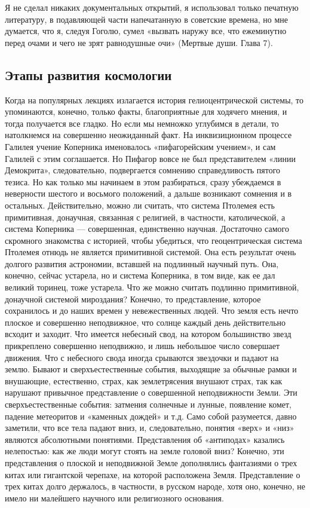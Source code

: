 Я не сделал никаких документальных открытий, я использовал только
печатную литературу, в подавляющей части напечатанную в советские
времена, но мне думается, что я, следуя Гоголю, сумел «вызвать наружу
все, что ежеминутно перед очами и чего не зрят равнодушные очи»
(Мертвые души. Глава 7).

\subsection{Этапы развития космологии}

Когда на популярных лекциях излагается история гелиоцентрической
системы, то упоминаются, конечно, только факты, благоприятные для
ходячего мнения, и тогда получается все гладко. Но если мы немножко
углубимся в детали, то натолкнемся на совершенно неожиданный факт. На
инквизиционном процессе Галилея учение Коперника именовалось
«пифагорейским учением», и сам Галилей с этим соглашается. Но Пифагор
вовсе не был представителем «линии Демокрита», следовательно,
подвергается сомнению справедливость пятого тезиса. Но как только мы
начинаем в этом разбираться, сразу убеждаемся в неверности шестого и
восьмого положений, а дальше возникают сомнения и в остальных.
Действительно, можно ли считать, что система Птолемея есть
примитивная, донаучная, связанная с религией, в частности,
католической, а система Коперника --- совершенная, единственно
научная. Достаточно самого скромного знакомства с историей, чтобы
убедиться, что геоцентрическая система Птолемея отнюдь не является
примитивной системой. Она есть результат очень долгого развития
астрономии, вставшей на подлинный научный путь. Она, конечно, сейчас
устарела, но и система Коперника, в том виде, как ее дал великий
торинец, тоже устарела. Что же можно считать подлинно примитивной,
донаучной системой мироздания? Конечно, то представление, которое
сохранилось и до наших времен у невежественных людей. Что земля есть
нечто плоское и совершенно неподвижное, что солнце каждый день
действительно всходит и заходит. Что имеется небесный свод, на котором
большинство звезд прикреплено совершенно неподвижно, и лишь небольшое
число совершает движения. Что с небесного свода иногда срываются
звездочки и падают на землю. Бывают и сверхъестественные события,
выходящие за обычные рамки и внушающие, естественно, страх, как
землетрясения внушают страх, так как нарушают привычное представление
о совершенной неподвижности Земли. Эти сверхъестественные события:
затмения солнечные и лунные, появление комет, падение метеоритов и
«каменных дождей» и т.д. Само собой разумеется, давно заметили, что
все тела падают вниз, и, следовательно, понятия «верх» и «низ»
являются абсолютными понятиями. Представления об «антиподах» казались
нелепостью: как же люди могут стоять на земле головой вниз? Конечно,
эти представления о плоской и неподвижной Земле дополнялись фантазиями
о трех китах или гигантской черепахе, на которой расположена Земля.
Представление о трех китах долго держалось, в частности, в русском
народе, хотя оно, конечно, не имело ни малейшего научного или
религиозного основания.


